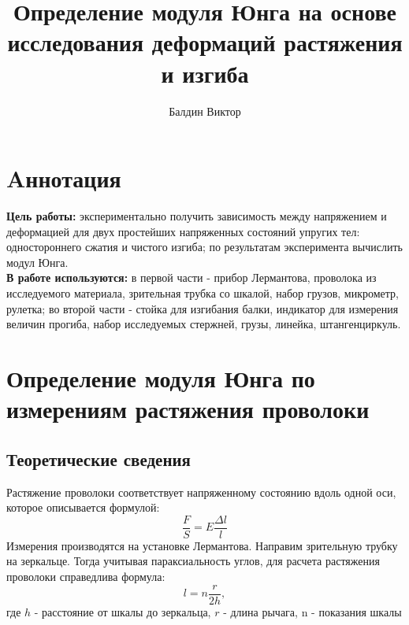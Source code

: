 \documentclass[12pt]{article}
\title{Определение модуля Юнга на основе исследования деформаций растяжения и изгиба}
\author{Балдин Виктор}
\begin{document}
    \maketitle

    \section{Aннотация}
    \textbf{Цель работы:} экспериментально получить зависимость между напряжением и деформацией
    для двух простейших напряженных состояний упругих тел: одностороннего сжатия и чистого изгиба;
    по результатам эксперимента вычислить модул Юнга.\\
    \textbf{В работе используются:} в первой части - прибор Лермантова, проволока
    из исследуемого материала,
     зрительная трубка со шкалой,
    набор грузов, микрометр, рулетка;  во второй части - стойка для изгибания балки, индикатор для
    измерения величин прогиба,
набор исследуемых стержней, грузы, линейка, штангенциркуль.

    \section{Определение модуля Юнга по измерениям растяжения проволоки}
    \subsection{Теоретические сведения}
    Растяжение проволоки соответствует напряженному состоянию вдоль одной оси, которое описывается формулой:
\begin{equation}
    \frac{F}{S} = E \frac{\Delta l}{l}
    \label{lermantov}
\end{equation}
Измерения производятся на установке Лермантова.
Направим зрительную трубку на зеркальце.
Тогда учитывая параксиальность углов,
для расчета растяжения проволоки справедлива формула:
\begin{equation}
    l = n\frac{r}{2h},
    \label{dlina}
\end{equation}
где $h$ - расстояние от шкалы до зеркальца,
$r$ - длина рычага, n - показания шкалы\\
\end{document}
